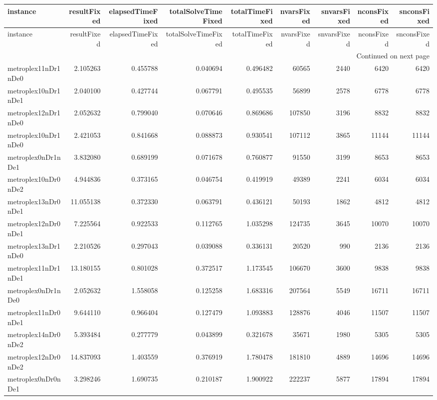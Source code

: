 
\begin{longtable}{|l|r|r|r|r|r|r|r|r|}
\toprule
instance & resultFixed & elapsedTimeFixed & totalSolveTimeFixed & totalTimeFixed & nvarsFixed & snvarsFixed & nconsFixed & snconsFixed \\
\midrule
\endfirsthead
\toprule
instance & resultFixed & elapsedTimeFixed & totalSolveTimeFixed & totalTimeFixed & nvarsFixed & snvarsFixed & nconsFixed & snconsFixed \\
\midrule
\endhead
\midrule
\multicolumn{9}{r}{Continued on next page} \\
\midrule
\endfoot
\bottomrule
\endlastfoot
metroplex11nDr1nDe0 & 2.105263 & 0.455788 & 0.040694 & 0.496482 & 60565 & 2440 & 6420 & 6420 \\
metroplex10nDr1nDe1 & 2.040100 & 0.427744 & 0.067791 & 0.495535 & 56899 & 2578 & 6778 & 6778 \\
metroplex12nDr1nDe0 & 2.052632 & 0.799040 & 0.070646 & 0.869686 & 107850 & 3196 & 8832 & 8832 \\
metroplex10nDr1nDe0 & 2.421053 & 0.841668 & 0.088873 & 0.930541 & 107112 & 3865 & 11144 & 11144 \\
metroplex0nDr1nDe1 & 3.832080 & 0.689199 & 0.071678 & 0.760877 & 91550 & 3199 & 8653 & 8653 \\
metroplex10nDr0nDe2 & 4.944836 & 0.373165 & 0.046754 & 0.419919 & 49389 & 2241 & 6034 & 6034 \\
metroplex13nDr0nDe1 & 11.055138 & 0.372330 & 0.063791 & 0.436121 & 50193 & 1862 & 4812 & 4812 \\
metroplex12nDr0nDe1 & 7.225564 & 0.922533 & 0.112765 & 1.035298 & 124735 & 3645 & 10070 & 10070 \\
metroplex13nDr1nDe0 & 2.210526 & 0.297043 & 0.039088 & 0.336131 & 20520 & 990 & 2136 & 2136 \\
metroplex11nDr1nDe1 & 13.180155 & 0.801028 & 0.372517 & 1.173545 & 106670 & 3600 & 9838 & 9838 \\
metroplex0nDr1nDe0 & 2.052632 & 1.558058 & 0.125258 & 1.683316 & 207564 & 5549 & 16711 & 16711 \\
metroplex11nDr0nDe1 & 9.644110 & 0.966404 & 0.127479 & 1.093883 & 128876 & 4046 & 11507 & 11507 \\
metroplex14nDr0nDe2 & 5.393484 & 0.277779 & 0.043899 & 0.321678 & 35671 & 1980 & 5305 & 5305 \\
metroplex12nDr0nDe2 & 14.837093 & 1.403559 & 0.376919 & 1.780478 & 181810 & 4889 & 14696 & 14696 \\
metroplex0nDr0nDe1 & 3.298246 & 1.690735 & 0.210187 & 1.900922 & 222237 & 5877 & 17894 & 17894 \\

\end{longtable}
